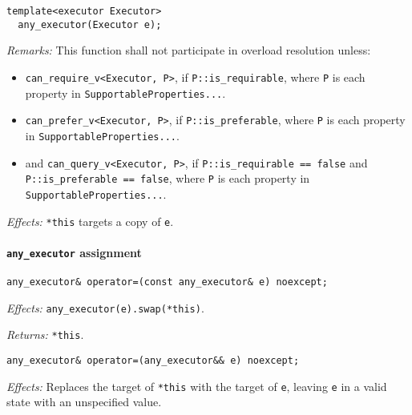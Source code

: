 \documentclass[a4paper,12pt,notitlepage,twoside,openright]{article}
\begin{document}
\begin{verbatim}
template<executor Executor>
  any_executor(Executor e);
\end{verbatim}

\emph{Remarks:} This function shall not participate in overload
resolution unless:

\begin{itemize}

\item
  \texttt{can_require_v<Executor, P>}, if
  \texttt{P::is_requirable}, where \texttt{P} is
  each property in \texttt{SupportableProperties...}.
\item
  \texttt{can_prefer_v<Executor, P>}, if
  \texttt{P::is_preferable}, where \texttt{P} is
  each property in \texttt{SupportableProperties...}.
\item
  and \texttt{can_query_v<Executor, P>}, if
  \texttt{P::is_requirable == false} and
  \texttt{P::is_preferable == false}, where
  \texttt{P} is each property in
  \texttt{SupportableProperties...}.
\end{itemize}

\emph{Effects:} \texttt{*this} targets a copy of
\texttt{e}.

\hypertarget{any_executor-assignment}{%
\paragraph{\texorpdfstring{\texttt{any_executor}
assignment}{ assignment}}\label{any_executor-assignment}}

\begin{verbatim}
any_executor& operator=(const any_executor& e) noexcept;
\end{verbatim}

\emph{Effects:} \texttt{any_executor(e).swap(*this)}.

\emph{Returns:} \texttt{*this}.

\begin{verbatim}
any_executor& operator=(any_executor&& e) noexcept;
\end{verbatim}

\emph{Effects:} Replaces the target of \texttt{*this} with
the target of \texttt{e}, leaving \texttt{e} in
a valid state with an unspecified value.
\end{document}
